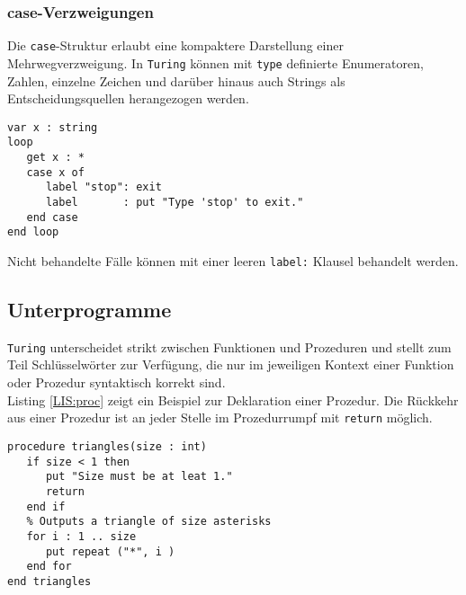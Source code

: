 \subsubsection{case-Verzweigungen}

Die \lstinline{case}-Struktur erlaubt eine kompaktere Darstellung einer Mehrwegverzweigung. In \texttt{Turing} k\"onnen mit \lstinline{type} definierte Enumeratoren, Zahlen, einzelne Zeichen und dar\"uber hinaus auch Strings als Entscheidungsquellen herangezogen werden. 

\lstset{label=LIS:case}
\begin{table}[h!]
\begin{lstlisting}
var x : string
loop
   get x : *
   case x of
      label "stop": exit
      label       : put "Type 'stop' to exit."
   end case
end loop
\end{lstlisting}
\end{table} 

Nicht behandelte F\"alle k\"onnen mit einer leeren \lstinline{label:} Klausel behandelt werden.

\subsection{Unterprogramme}

\texttt{Turing} unterscheidet strikt zwischen Funktionen und Prozeduren und stellt zum Teil Schl\"usselw\"orter zur Verf\"ugung,  die nur im jeweiligen Kontext einer Funktion oder Prozedur syntaktisch korrekt sind. \\
Listing \ref{LIS:proc} zeigt ein Beispiel zur Deklaration einer Prozedur. Die R\"uckkehr aus einer Prozedur ist an jeder Stelle im Prozedurrumpf mit \lstinline{return} m\"oglich.

\lstset{label=LIS:proc}
\begin{table}[h!]
\begin{lstlisting}
procedure triangles(size : int)
   if size < 1 then
      put "Size must be at leat 1."
      return
   end if
   % Outputs a triangle of size asterisks
   for i : 1 .. size
      put repeat ("*", i )
   end for
end triangles
\end{lstlisting}
\end{table}


